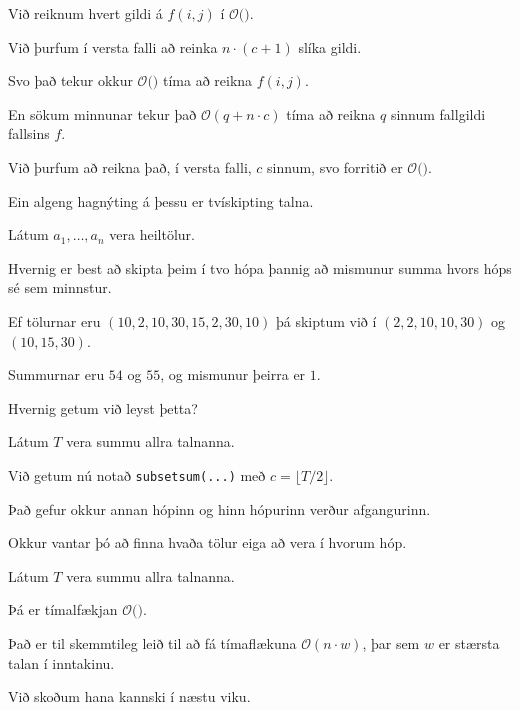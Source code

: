{
}

{
	{
		\item<1-> Við reiknum hvert gildi á $f(i, j)$ í $\mathcal{O}($\onslide<2->{$\,1\,$}$)$.
		\item<3-> Við þurfum í versta falli að reinka $n \cdot (c + 1)$ slíka gildi.
		\item<4-> Svo það tekur okkur $\mathcal{O}($$)$ tíma að reikna $f(i, j)$.
		\item<6-> En sökum minnunar tekur það $\mathcal{O}(q + n \cdot c)$ tíma að reikna $q$ sinnum fallgildi fallsins $f$.
		\item<7-> Við þurfum að reikna það, í versta falli, $c$ sinnum, svo forritið er $\mathcal{O}($\onslide<8->{$n \cdot c$}$)$.
	}
}

{
	{
		\item<1-> Ein algeng hagnýting á þessu er tvískipting talna.
		\item<2-> Látum $a_1, \dots, a_n$ vera heiltölur.
		\item<3-> Hvernig er best að skipta þeim í tvo hópa þannig að mismunur summa hvors hóps sé sem minnstur.
		\item<4-> Ef tölurnar eru $(10, 2, 10, 30, 15, 2, 30, 10)$ þá skiptum við í $(2, 2, 10, 10, 30)$ og $(10, 15, 30)$.
		\item<5-> Summurnar eru $54$ og $55$, og mismunur þeirra er $1$.
	}
}

{
	{
		\item<1-> Hvernig getum við leyst þetta?
		\item<2-> Látum $T$ vera summu allra talnanna.
		\item<3-> Við getum nú notað \texttt{subsetsum(...)} með $c = \lfloor T/2 \rfloor$.
		\item<4-> Það gefur okkur annan hópinn og hinn hópurinn verður afgangurinn.
		\item<5-> Okkur vantar þó að finna hvaða tölur eiga að vera í hvorum hóp.
	}
}

{
}

{
	{
		\item<1-> Látum $T$ vera summu allra talnanna.
		\item<2-> Þá er tímalfækjan $\mathcal{O}($\onslide<3->{$n \cdot T$}$)$.
		\item<4-> Það er til skemmtileg leið til að fá tímaflækuna $\mathcal{O}(n \cdot w)$, þar sem $w$ er stærsta talan í inntakinu.
		\item<5-> Við skoðum hana kannski í næstu viku.
	}
}

